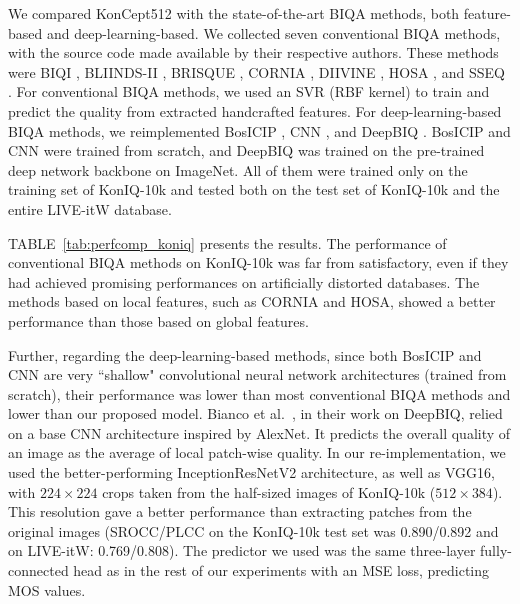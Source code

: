 \documentclass[10pt,journal,compsoc]{IEEEtran}
\begin{document}
We compared KonCept512 with the state-of-the-art BIQA methods, both feature-based and deep-learning-based. We collected seven conventional BIQA methods, with the source code made available by their respective authors. These methods were BIQI \cite{Moorthy:2010}, BLIINDS-II \cite{blind2}, BRISQUE \cite{bris}, CORNIA \cite{ye2012unsupervised}, DIIVINE \cite{Moorthy:2011}, HOSA \cite{hosa}, and SSEQ \cite{Liu:2014b}.
For conventional BIQA methods, we used an SVR (RBF kernel) to train and predict the quality from extracted handcrafted features. 
For deep-learning-based BIQA methods, we reimplemented BosICIP \cite{boss}, CNN \cite{conv1}, and DeepBIQ \cite{bianco2018use}. BosICIP and CNN were trained from scratch, and DeepBIQ was trained on the pre-trained deep network backbone on ImageNet. 
All of them were trained only on the training set of KonIQ-10k and tested both on the test set of KonIQ-10k and the entire LIVE-itW database.

TABLE~\ref{tab:perfcomp_koniq} presents the results. The performance of conventional BIQA methods on KonIQ-10k was far from satisfactory, even if they had achieved promising performances on artificially distorted databases. The methods based on local features, such as CORNIA and HOSA, showed a better performance than those based on global features.

Further, regarding the deep-learning-based methods, since both BosICIP and CNN are very ``shallow" convolutional neural network architectures (trained from scratch), their performance was lower than most conventional BIQA methods and lower than our proposed model.
Bianco et al.\ \cite{bianco2018use}, in their work on DeepBIQ, relied on a base CNN architecture inspired by AlexNet. It predicts the overall quality of an image as the average of local patch-wise quality. In our re-implementation, we used the better-performing InceptionResNetV2 architecture, as well as VGG16, with $224\times224$ crops taken from the half-sized images of KonIQ-10k ($512\times384$). This resolution gave a better performance than extracting patches from the original images (SROCC/PLCC on the KonIQ-10k test set was 0.890/0.892 and on LIVE-itW: 0.769/0.808). The predictor we used was the same three-layer fully-connected head as in the rest of our experiments with an MSE loss, predicting MOS values.
\end{document}
